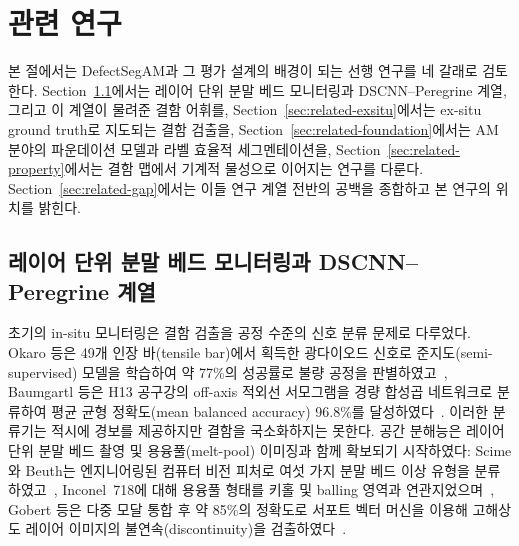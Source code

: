 
\section{관련 연구}
\label{sec:related}

본 절에서는 DefectSegAM과 그 평가 설계의 배경이 되는 선행 연구를 네 갈래로
검토한다. Section~\ref{sec:related-monitoring}에서는 레이어 단위 분말 베드
모니터링과 DSCNN--Peregrine 계열, 그리고 이 계열이 물려준 결함 어휘를,
Section~\ref{sec:related-exsitu}에서는 ex-situ ground truth로 지도되는 결함
검출을, Section~\ref{sec:related-foundation}에서는 AM 분야의 파운데이션
모델과 라벨 효율적 세그멘테이션을, Section~\ref{sec:related-property}에서는
결함 맵에서 기계적 물성으로 이어지는 연구를 다룬다.
Section~\ref{sec:related-gap}에서는 이들 연구 계열 전반의 공백을 종합하고 본
연구의 위치를 밝힌다.

\subsection{레이어 단위 분말 베드 모니터링과 DSCNN--Peregrine 계열}
\label{sec:related-monitoring}

초기의 in-situ 모니터링은 결함 검출을 공정 수준의 신호 분류 문제로 다루었다.
Okaro 등은 49개 인장 바(tensile bar)에서 획득한 광다이오드 신호로
준지도(semi-supervised) 모델을 학습하여 약 77\%의 성공률로 불량 공정을
판별하였고~\cite{Okaro2019SemiSup}, Baumgartl 등은 H13 공구강의 off-axis
적외선 서모그램을 경량 합성곱 네트워크로 분류하여 평균 균형 정확도(mean
balanced accuracy) 96.8\%를 달성하였다~\cite{Baumgartl2020IRCNN}. 이러한
분류기는 적시에 경보를 제공하지만 결함을 국소화하지는 못한다. 공간 분해능은
레이어 단위 분말 베드 촬영 및 용융풀(melt-pool) 이미징과 함께 확보되기
시작하였다: Scime와 Beuth는 엔지니어링된 컴퓨터 비전 피처로 여섯 가지 분말
베드 이상 유형을 분류하였고~\cite{Scime2018Anomaly}, Inconel~718에 대해
용융풀 형태를 키홀 및 balling 영역과 연관지었으며~\cite{Scime2019MeltPool},
Gobert 등은 다중 모달 통합 후 약 85\%의 정확도로 서포트 벡터 머신을 이용해
고해상도 레이어 이미지의 불연속(discontinuity)을
검출하였다~\cite{Gobert2018InProcess}.

